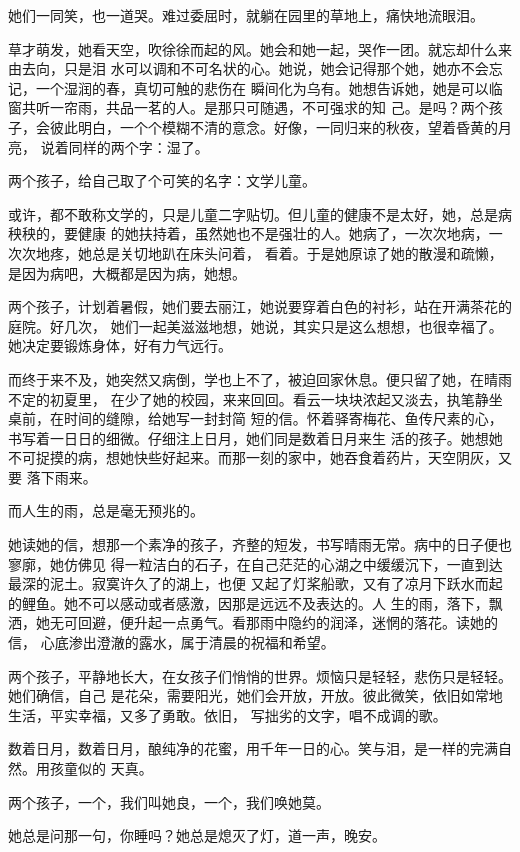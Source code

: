 		她们一同笑，也一道哭。难过委屈时，就躺在园里的草地上，痛快地流眼泪。

		草才萌发，她看天空，吹徐徐而起的风。她会和她一起，哭作一团。就忘却什么来由去向，只是泪
	水可以调和不可名状的心。她说，她会记得那个她，她亦不会忘记，一个湿润的春，真切可触的悲伤在
	瞬间化为乌有。她想告诉她，她是可以临窗共听一帘雨，共品一茗的人。是那只可随遇，不可强求的知
	己。是吗？两个孩子，会彼此明白，一个个模糊不清的意念。好像，一同归来的秋夜，望着昏黄的月亮，
	说着同样的两个字：湿了。

		两个孩子，给自己取了个可笑的名字：文学儿童。

		或许，都不敢称文学的，只是儿童二字贴切。但儿童的健康不是太好，她，总是病秧秧的，要健康
	的她扶持着，虽然她也不是强壮的人。她病了，一次次地病，一次次地疼，她总是关切地趴在床头问着，
	看着。于是她原谅了她的散漫和疏懒，是因为病吧，大概都是因为病，她想。

		两个孩子，计划着暑假，她们要去丽江，她说要穿着白色的衬衫，站在开满茶花的庭院。好几次，
	她们一起美滋滋地想，她说，其实只是这么想想，也很幸福了。她决定要锻炼身体，好有力气远行。

		而终于来不及，她突然又病倒，学也上不了，被迫回家休息。便只留了她，在晴雨不定的初夏里，
	在少了她的校园，来来回回。看云一块块浓起又淡去，执笔静坐桌前，在时间的缝隙，给她写一封封简
	短的信。怀着驿寄梅花、鱼传尺素的心，书写着一日日的细微。仔细注上日月，她们同是数着日月来生
	活的孩子。她想她不可捉摸的病，想她快些好起来。而那一刻的家中，她吞食着药片，天空阴灰，又要
	落下雨来。

		而人生的雨，总是毫无预兆的。

		她读她的信，想那一个素净的孩子，齐整的短发，书写晴雨无常。病中的日子便也寥廓，她仿佛见
	得一粒洁白的石子，在自己茫茫的心湖之中缓缓沉下，一直到达最深的泥土。寂寞许久了的湖上，也便
	又起了灯桨船歌，又有了凉月下跃水而起的鲤鱼。她不可以感动或者感激，因那是远远不及表达的。人
	生的雨，落下，飘洒，她无可回避，便升起一点勇气。看那雨中隐约的润泽，迷惘的落花。读她的信，
	心底渗出澄澈的露水，属于清晨的祝福和希望。

		两个孩子，平静地长大，在女孩子们悄悄的世界。烦恼只是轻轻，悲伤只是轻轻。她们确信，自己
	是花朵，需要阳光，她们会开放，开放。彼此微笑，依旧如常地生活，平实幸福，又多了勇敢。依旧，
	写拙劣的文字，唱不成调的歌。

		数着日月，数着日月，酿纯净的花蜜，用千年一日的心。笑与泪，是一样的完满自然。用孩童似的
	天真。

		两个孩子，一个，我们叫她良，一个，我们唤她莫。

		她总是问那一句，你睡吗？她总是熄灭了灯，道一声，晚安。

